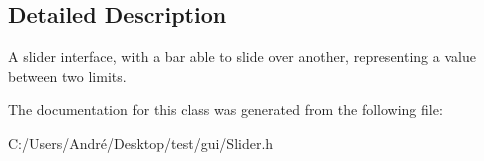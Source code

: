 \subsection{Detailed Description}
A slider interface, with a bar able to slide over another, representing a value between two limits. 

The documentation for this class was generated from the following file\+:\begin{DoxyCompactItemize}
\item 
C\+:/\+Users/\+André/\+Desktop/test/gui/Slider.\+h\end{DoxyCompactItemize}
